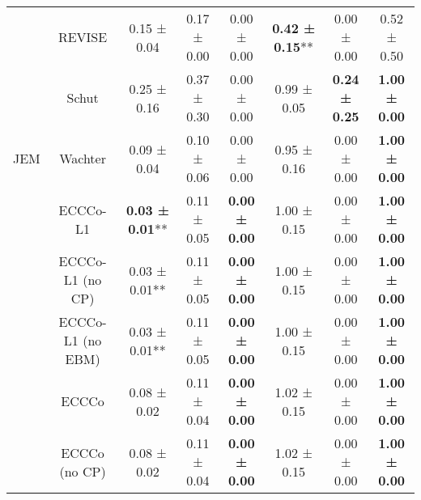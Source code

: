 \begin{table}
{\begin{tabular}[t]{cccccccc}
 & REVISE & 0.15 ± 0.04\hphantom{*}\hphantom{*} & 0.17 ± 0.00\hphantom{*}\hphantom{*} & 0.00 ± 0.00\hphantom{*}\hphantom{*} & \textbf{0.42 ± 0.15}** & 0.00 ± 0.00\hphantom{*}\hphantom{*} & 0.52 ± 0.50\hphantom{*}\hphantom{*}\\

 & Schut & 0.25 ± 0.16\hphantom{*}\hphantom{*} & 0.37 ± 0.30\hphantom{*}\hphantom{*} & 0.00 ± 0.00\hphantom{*}\hphantom{*} & 0.99 ± 0.05\hphantom{*}\hphantom{*} & \textbf{0.24 ± 0.25}\hphantom{*}\hphantom{*} & \textbf{1.00 ± 0.00}\hphantom{*}\hphantom{*}\\

\multirow[t]{-9}{*}{\centering\arraybackslash JEM} & Wachter & 0.09 ± 0.04\hphantom{*}\hphantom{*} & 0.10 ± 0.06\hphantom{*}\hphantom{*} & 0.00 ± 0.00\hphantom{*}\hphantom{*} & 0.95 ± 0.16\hphantom{*}\hphantom{*} & 0.00 ± 0.00\hphantom{*}\hphantom{*} & \textbf{1.00 ± 0.00}\hphantom{*}\hphantom{*}\\
\cmidrule{1-8}
 & ECCCo-L1 & \textbf{0.03 ± 0.01}** & 0.11 ± 0.05\hphantom{*}\hphantom{*} & \textbf{0.00 ± 0.00}\hphantom{*}\hphantom{*} & 1.00 ± 0.15\hphantom{*}\hphantom{*} & 0.00 ± 0.00\hphantom{*}\hphantom{*} & \textbf{1.00 ± 0.00}\hphantom{*}\hphantom{*}\\

 & ECCCo-L1 (no CP) & 0.03 ± 0.01** & 0.11 ± 0.05\hphantom{*}\hphantom{*} & \textbf{0.00 ± 0.00}\hphantom{*}\hphantom{*} & 1.00 ± 0.15\hphantom{*}\hphantom{*} & 0.00 ± 0.00\hphantom{*}\hphantom{*} & \textbf{1.00 ± 0.00}\hphantom{*}\hphantom{*}\\

 & ECCCo-L1 (no EBM) & 0.03 ± 0.01** & 0.11 ± 0.05\hphantom{*}\hphantom{*} & \textbf{0.00 ± 0.00}\hphantom{*}\hphantom{*} & 1.00 ± 0.15\hphantom{*}\hphantom{*} & 0.00 ± 0.00\hphantom{*}\hphantom{*} & \textbf{1.00 ± 0.00}\hphantom{*}\hphantom{*}\\

 & ECCCo & 0.08 ± 0.02\hphantom{*}\hphantom{*} & 0.11 ± 0.04\hphantom{*}\hphantom{*} & \textbf{0.00 ± 0.00}\hphantom{*}\hphantom{*} & 1.02 ± 0.15\hphantom{*}\hphantom{*} & 0.00 ± 0.00\hphantom{*}\hphantom{*} & \textbf{1.00 ± 0.00}\hphantom{*}\hphantom{*}\\

 & ECCCo (no CP) & 0.08 ± 0.02\hphantom{*}\hphantom{*} & 0.11 ± 0.04\hphantom{*}\hphantom{*} & \textbf{0.00 ± 0.00}\hphantom{*}\hphantom{*} & 1.02 ± 0.15\hphantom{*}\hphantom{*} & 0.00 ± 0.00\hphantom{*}\hphantom{*} & \textbf{1.00 ± 0.00}\hphantom{*}\hphantom{*}\\


\end{tabular}}
\end{table}
